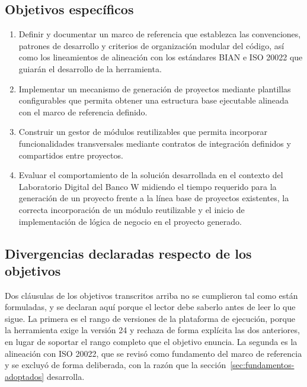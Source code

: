 \subsection{Objetivos específicos}
\begin{enumerate}
\item Definir y documentar un marco de referencia que establezca las convenciones, patrones de desarrollo y criterios de organización modular del código, así como los lineamientos de alineación con los estándares BIAN e ISO 20022 que guiarán el desarrollo de la herramienta.

\item Implementar un mecanismo de generación de proyectos mediante plantillas configurables que permita obtener una estructura base ejecutable alineada con el marco de referencia definido.

\item Construir un gestor de módulos reutilizables que permita incorporar funcionalidades transversales mediante contratos de integración definidos y compartidos entre proyectos.

\item Evaluar el comportamiento de la solución desarrollada en el contexto del Laboratorio Digital del Banco W midiendo el tiempo requerido para la generación de un proyecto frente a la línea base de proyectos existentes, la correcta incorporación de un módulo reutilizable y el inicio de implementación de lógica de negocio en el proyecto generado.

\end{enumerate}

\subsection{Divergencias declaradas respecto de los objetivos}
\label{sec:divergencias}

Dos cláusulas de los objetivos transcritos arriba no se cumplieron tal como
están formuladas, y se declaran aquí porque el lector debe saberlo antes de
leer lo que sigue. La primera es el rango de versiones de la plataforma de
ejecución, porque la herramienta exige la versión 24 y rechaza de forma
explícita las dos anteriores, en lugar de soportar el rango completo que el
objetivo enuncia. La segunda es la alineación con ISO 20022, que se revisó
como fundamento del marco de referencia y se excluyó de forma deliberada, con
la razón que la sección~\ref{sec:fundamentos-adoptados} desarrolla.

